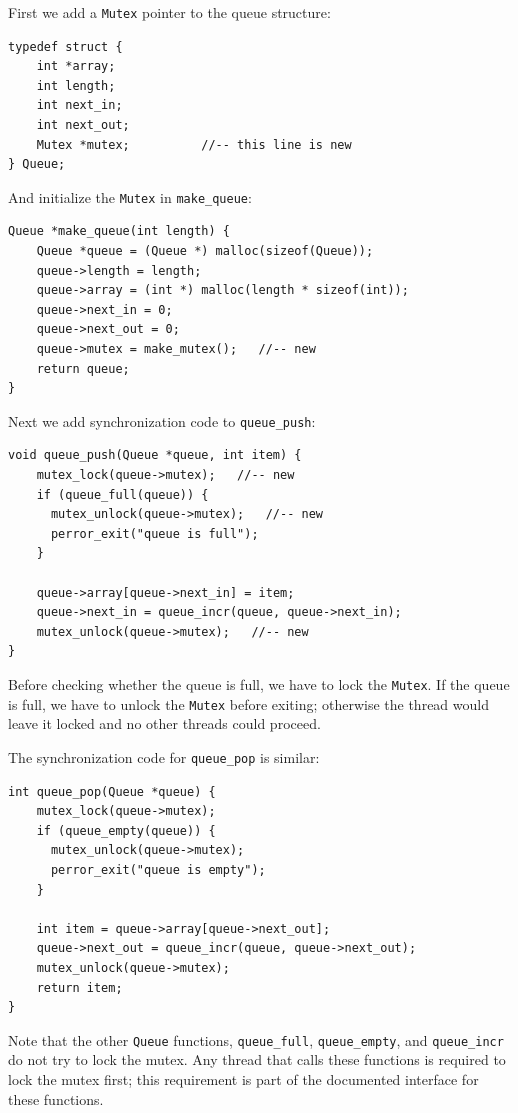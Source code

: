 \documentclass[12pt]{book}
\begin{document}
{First we add a {\tt Mutex} pointer to the queue structure:

\begin{verbatim}
typedef struct {
    int *array;
    int length;
    int next_in;
    int next_out;
    Mutex *mutex;          //-- this line is new
} Queue;
\end{verbatim}

And initialize the {\tt Mutex} in \verb"make_queue":

\begin{verbatim}
Queue *make_queue(int length) {
    Queue *queue = (Queue *) malloc(sizeof(Queue));
    queue->length = length;
    queue->array = (int *) malloc(length * sizeof(int));
    queue->next_in = 0;
    queue->next_out = 0;
    queue->mutex = make_mutex();   //-- new
    return queue;
}
\end{verbatim}

Next we add synchronization code to \verb"queue_push":

\begin{verbatim}
void queue_push(Queue *queue, int item) {
    mutex_lock(queue->mutex);   //-- new
    if (queue_full(queue)) {
      mutex_unlock(queue->mutex);   //-- new
      perror_exit("queue is full");
    }
  
    queue->array[queue->next_in] = item;
    queue->next_in = queue_incr(queue, queue->next_in);
    mutex_unlock(queue->mutex);   //-- new
}
\end{verbatim}

Before checking whether the queue is full, we have to lock
the {\tt Mutex}.  If the queue is full, we have to unlock
the {\tt Mutex} before exiting; otherwise the thread would leave
it locked and no other threads could proceed.

The synchronization code for \verb"queue_pop" is similar:

\begin{verbatim}
int queue_pop(Queue *queue) {
    mutex_lock(queue->mutex);
    if (queue_empty(queue)) {
      mutex_unlock(queue->mutex);
      perror_exit("queue is empty");
    }
  
    int item = queue->array[queue->next_out];
    queue->next_out = queue_incr(queue, queue->next_out);
    mutex_unlock(queue->mutex);
    return item;
}
\end{verbatim}

Note that the other {\tt Queue} functions, \verb"queue_full",
\verb"queue_empty", and \verb"queue_incr" do not try to lock
the mutex.  Any thread that calls these functions is required to
lock the mutex first; this requirement is part of the documented
interface for these functions.

}
\end{document}
